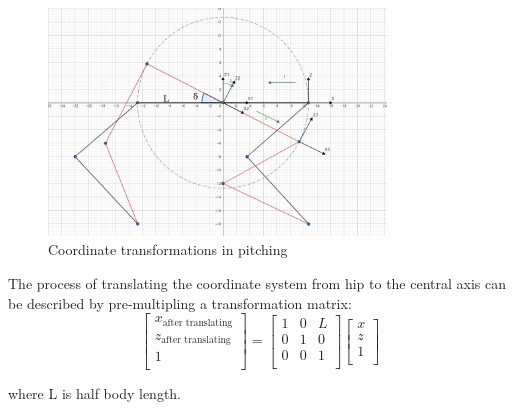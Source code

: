 \begin{figure}[htbp]
   \centering
   \includegraphics[width=0.8\textwidth]{figures/coordinate_transformations_in_pitching.jpg}
   \caption{Coordinate transformations in pitching}
   \label{fig:coordinate_transformations_in_pitching}
\end{figure}

The process of translating the coordinate system from hip to the central axis can be described by pre-multipling a transformation matrix:
\begin{equation}
   \begin{bmatrix}
   x_\text{after translating} \\
   z_\text{after translating} \\
   1                          \\
   \end{bmatrix}
   =
   \begin{bmatrix}
   1 & 0 & L \\
   0 & 1 & 0 \\
   0 & 0 & 1 \\
   \end{bmatrix}
   \begin{bmatrix}
   x \\
   z \\
   1 \\
   \end{bmatrix}
\end{equation}

where L is half body length.

